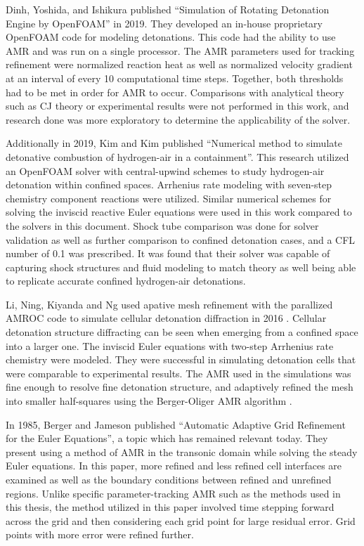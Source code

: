 Dinh, Yoshida, and Ishikura published ``Simulation of Rotating Detonation Engine by OpenFOAM''\cite{dinh} in 2019. They developed an in-house proprietary OpenFOAM code for modeling detonations. This code had the ability to use AMR and was run on a single processor. The AMR parameters used for tracking refinement were normalized reaction heat as well as normalized velocity gradient at an interval of every 10 computational time steps. Together, both thresholds had to be met in order for AMR to occur. Comparisons with analytical theory such as CJ theory or experimental results were not performed in this work, and research done was more exploratory to determine the applicability of the solver. 

Additionally in 2019, Kim and Kim published ``Numerical method to simulate detonative combustion of hydrogen-air in a containment''\cite{kim}. This research utilized an OpenFOAM solver with central-upwind schemes to study hydrogen-air detonation within confined spaces. Arrhenius rate modeling with seven-step chemistry component reactions were utilized. Similar numerical schemes for solving the inviscid reactive Euler equations were used in this work compared to the solvers in this document. Shock tube comparison was done for solver validation as well as further comparison to confined detonation cases, and a CFL number of 0.1 was prescribed. It was found that their solver was capable of capturing shock structures and fluid modeling to match theory as well being able to replicate accurate confined hydrogen-air detonations. 

Li, Ning, Kiyanda and Ng used apative mesh refinement with the parallized AMROC code to simulate cellular detonation diffraction in 2016 \cite{li}. Cellular detonation structure diffracting can be seen when emerging from a confined space into a larger one. The inviscid Euler equations with two-step Arrhenius rate chemistry were modeled. They were successful in simulating detonation cells that were comparable to experimental results. The AMR used in the simulations was fine enough to resolve fine detonation structure, and adaptively refined the mesh into smaller half-squares using the Berger-Oliger AMR algorithm \cite{berger1984}. 

In 1985, Berger and Jameson published ``Automatic Adaptive Grid Refinement for the Euler Equations''\cite{berger1985}, a topic which has remained relevant today. They present using a method of AMR in the transonic domain while solving the steady Euler equations. In this paper, more refined and less refined cell interfaces are examined as well as the boundary conditions between refined and unrefined regions. Unlike specific parameter-tracking AMR such as the methods used in this thesis, the method utilized in this paper involved time stepping forward across the grid and then considering each grid point for large residual error. Grid points with more error were refined further. 

